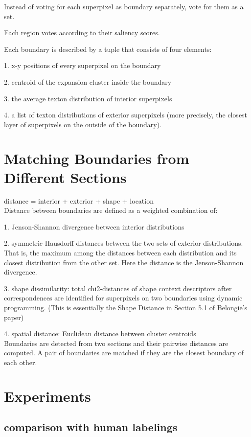 \documentclass{llncs}
\begin{document}
Instead of voting for each superpixel as boundary separately, vote for them as a set.

Each region votes according to their saliency scores.

Each boundary is described by a tuple that consists of four elements:

1. x-y positions of every superpixel on the boundary

2. centroid of the expansion cluster inside the boundary

3. the average texton distribution of interior superpixels

4. a list of texton distributions of exterior superpixels (more precisely, the closest layer of superpixels on the outside of the boundary).

\section{Matching Boundaries from Different Sections}

distance = interior + exterior + shape + location 
\\

Distance between boundaries are defined as a weighted combination of:

1. Jenson-Shannon divergence between interior distributions

2. symmetric Hausdorff distances between the two sets of exterior distributions. That is, the maximum among the distances between each distribution and its closest distribution from the other set. Here the distance is the Jenson-Shannon divergence.

3. shape dissimilarity: total chi2-distances of shape context descriptors after correspondences are identified for superpixels on two boundaries using dynamic programming. (This is essentially the Shape Distance in Section 5.1 of Belongie's paper)

4. spatial distance: Euclidean distance between cluster centroids
\\

Boundaries are detected from two sections and their pairwise distances are computed. A pair of boundaries are matched if they are the closest boundary of each other.

\section{Experiments}

\subsection{comparison with human labelings}
\end{document}
